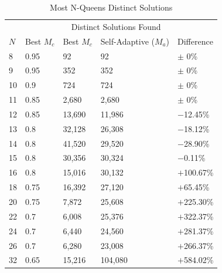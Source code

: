 \documentclass[conference]{IEEEtran}
\begin{document}
\begin{table}
\centering
\caption{Most N-Queens Distinct Solutions}
\begin{tabular}{|l|l|l|l|l|} \hline
&               &  \multicolumn{2}{c|}{Distinct Solutions Found}& \\ \cline{3-4}
$N$&  Best $M_{c}$&  Best $M_{c}$&    Self-Adaptive ($M_{a}$)&    Difference\\ \hline
8&  0.95&          92&              92&                         $\pm$ 0\% \\ \hline                        
9&  0.95&          352&             352&                        $\pm$ 0\% \\ \hline
10& 0.9&           724&             724&                        $\pm$ 0\% \\ \hline
11& 0.85&          2,680&           2,680&                      $\pm$ 0\% \\ \hline
12& 0.85&          13,690&          11,986&                     $-$12.45\% \\ \hline
13& 0.8&           32,128&          26,308&                     $-$18.12\% \\ \hline
14& 0.8&           41,520&          29,520&                     $-$28.90\% \\ \hline
15& 0.8&           30,356&          30,324&                     $-$0.11\% \\ \hline
16& 0.8&           15,016&          30,132&                     $+$100.67\% \\ \hline
18& 0.75&          16,392&          27,120&                     $+$65.45\% \\ \hline
20& 0.75&          7,872&           25,608&                     $+$225.30\% \\ \hline
22& 0.7&           6,008&           25,376&                     $+$322.37\% \\ \hline
24& 0.7&           6,440&           24,560&                     $+$281.37\% \\ \hline
26& 0.7&           6,280&           23,008&                     $+$266.37\% \\ \hline
32& 0.65&          15,216&          104,080&                    $+$584.02\% \\ \hline
\end{tabular}
\label{table:distinctsol}
\end{table}
\end{document}
